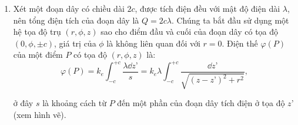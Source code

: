 \begin{loigiai}
\begin{enumerate}[1)]
  \item Xét một đoạn dây có chiều dài $2c$, được tích điện đều với mật độ điện dài $\lambda$, nên tổng điện tích của đoạn dây là $Q=2c\lambda$. Chúng ta bắt đầu sử dụng một hệ tọa độ trụ $(r,\phi,z)$ sao cho điểm đầu và cuối của đoạn dây có tọa độ $(0,\phi, \pm c)$, giá trị của $\phi$ là không liên quan đối với $r=0$. Điện thế $\varphi(P)$ của một điểm $P$ có tọa độ $(r,\phi,z)$ là:
  \[\varphi (P) = k_e \int_{-c}^{+c} \frac{\lambda \dd z’}{s} = k_e \lambda \int_{-c}^{+c} \frac{\dd z’}{\sqrt{(z-z’)^2 +r^2}} , \tag{1} \]

ở đây $s$ là khoảng cách từ $P$ đến một phần của đoạn dây tích điện ở tọa độ $z’$ (xem hình vẽ). 
  \begin{center}



\begin{tikzpicture}[x=0.75pt,y=0.75pt,yscale=-1,xscale=1]


\end{tikzpicture}
\end{center}
\end{enumerate}
\end{loigiai}
